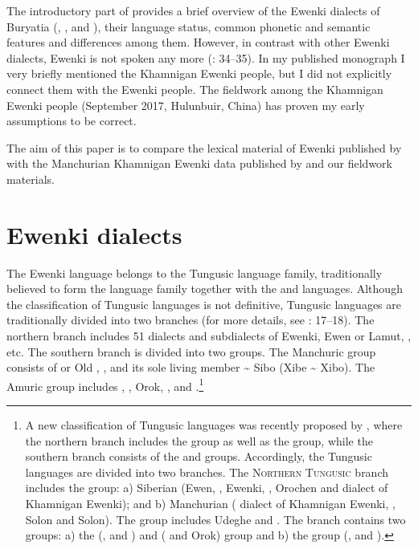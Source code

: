 \documentclass[output=paper,colorlinks,citecolor=brown]{langscibook}
\begin{document}
The introductory part of \citet{Khabtagaeva2017} provides a brief overview of the Ewenki dialects of Buryatia (, ,  and ), their language status, common phonetic and semantic features and differences among them. However, in contrast with other Ewenki dialects,  Ewenki is not spoken any more (\citealt{Khabtagaeva2017}: 34--35). In my published monograph I very briefly mentioned the Khamnigan Ewenki people, but I did not explicitly connect them with the  Ewenki people. The fieldwork among the Khamnigan Ewenki people (September 2017, Hulunbuir, China) has proven my early assumptions to be correct.

The aim of this paper is to compare the lexical material of  Ewenki published by \citet{Castrén1856} with the Manchurian Khamnigan Ewenki data published by \citet{Janhunen1991} and our fieldwork materials.

\section{Ewenki dialects}

The Ewenki language belongs to the Tungusic language family, traditionally believed to form the  language family together with the  and  languages. Although the classification of Tungusic languages is not definitive, Tungusic languages are traditionally divided into two branches (for more details, see \citealt{Khabtagaeva2017}: 17--18). The northern branch includes 51 dialects and subdialects of Ewenki, Ewen or Lamut, , etc. The southern branch is divided into two groups. The Manchuric group consists of  or Old , , and its sole living member  {\textasciitilde} Sibo (Xibe {\textasciitilde} Xibo). The Amuric group includes , , Orok, , and .\footnote{A new classification of Tungusic languages was recently proposed by \citet[16]{Janhunen2012a}, where the northern branch includes the  group as well as the  group, while the southern branch consists of the  and  groups. Accordingly, the Tungusic languages are divided into two branches. The \textsc{Northern Tungusic} branch includes the  group: a) Siberian  (Ewen, , Ewenki, , Orochen and  dialect of Khamnigan Ewenki); and b) Manchurian  ( dialect of Khamnigan Ewenki, ,  Solon and  Solon). The  group includes Udeghe and . The \textsc{} branch contains two groups: a) the  (,  and ) and  ( and Orok) group and b) the  group (,  and ).}
\end{document}
